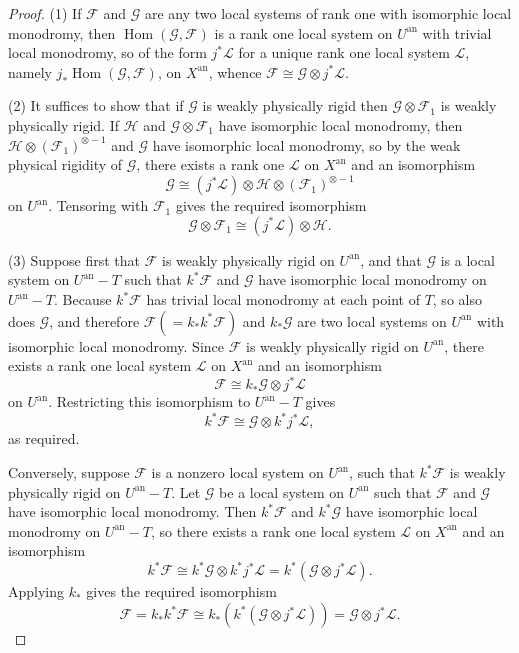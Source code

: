 \begin{proof}
(1) If \(\mathcal{F}\) and \(\mathcal{G}\) are any two local systems of rank
one with isomorphic local monodromy, then
\(\operatorname{Hom}(\mathcal{G},\mathcal{F})\) is a rank one local system on
\(U^{\mathrm{an}}\) with trivial local monodromy, so of the form \(j^*\mathcal{L}\)
for a unique rank one local system \(\mathcal{L}\), namely
\(j_*\operatorname{Hom}(\mathcal{G},\mathcal{F})\), on \(X^{\mathrm{an}}\),
whence \(\mathcal{F}\cong\mathcal{G}\otimes j^*\mathcal{L}\).

(2) It suffices to show that if \(\mathcal{G}\) is weakly physically rigid then
\(\mathcal{G}\otimes\mathcal{F}_1\) is weakly physically rigid. If
\(\mathcal{H}\) and \(\mathcal{G}\otimes\mathcal{F}_1\) have isomorphic local
monodromy, then \(\mathcal{H}\otimes(\mathcal{F}_1)^{\otimes -1}\) and
\(\mathcal{G}\) have isomorphic local monodromy, so by the weak physical
rigidity of \(\mathcal{G}\), there exists a rank one \(\mathcal{L}\) on
\(X^{\mathrm{an}}\) and an isomorphism
\[
  \mathcal{G}\cong
  (j^*\mathcal{L})\otimes\mathcal{H}\otimes(\mathcal{F}_1)^{\otimes -1}
\]
on \(U^{\mathrm{an}}\). Tensoring with \(\mathcal{F}_1\) gives the required
isomorphism
\[
  \mathcal{G}\otimes\mathcal{F}_1\cong (j^*\mathcal{L})\otimes\mathcal{H}.
\]

(3) Suppose first that \(\mathcal{F}\) is weakly physically rigid on
\(U^{\mathrm{an}}\), and that \(\mathcal{G}\) is a local system on
\(U^{\mathrm{an}}-T\) such that \(k^*\mathcal{F}\) and \(\mathcal{G}\) have
isomorphic local monodromy on \(U^{\mathrm{an}}-T\). Because \(k^*\mathcal{F}\)
has trivial local monodromy at each point of \(T\), so also does
\(\mathcal{G}\), and therefore \(\mathcal{F}(=k_*k^*\mathcal{F})\) and
\(k_*\mathcal{G}\) are two local systems on \(U^{\mathrm{an}}\) with
isomorphic local monodromy. Since \(\mathcal{F}\) is weakly physically rigid on
\(U^{\mathrm{an}}\), there exists a rank one local system \(\mathcal{L}\) on
\(X^{\mathrm{an}}\) and an isomorphism
\[
  \mathcal{F}\cong k_*\mathcal{G}\otimes j^*\mathcal{L}
\]
on \(U^{\mathrm{an}}\). Restricting this isomorphism to \(U^{\mathrm{an}}-T\)
gives
\[
  k^*\mathcal{F}\cong\mathcal{G}\otimes k^*j^*\mathcal{L},
\]
as required.

Conversely, suppose \(\mathcal{F}\) is a nonzero local system on
\(U^{\mathrm{an}}\), such that \(k^*\mathcal{F}\) is weakly physically rigid on
\(U^{\mathrm{an}}-T\). Let \(\mathcal{G}\) be a local system on
\(U^{\mathrm{an}}\) such that \(\mathcal{F}\) and \(\mathcal{G}\) have
isomorphic local monodromy. Then \(k^*\mathcal{F}\) and \(k^*\mathcal{G}\) have
isomorphic local monodromy on \(U^{\mathrm{an}}-T\), so there exists a rank one
local system \(\mathcal{L}\) on \(X^{\mathrm{an}}\) and an isomorphism
\[
  k^*\mathcal{F}\cong k^*\mathcal{G}\otimes k^*j^*\mathcal{L}
  =k^*(\mathcal{G}\otimes j^*\mathcal{L}).
\]
Applying \(k_*\) gives the required isomorphism
\[
  \mathcal{F}=k_*k^*\mathcal{F}
  \cong k_*(k^*(\mathcal{G}\otimes j^*\mathcal{L}))
  =
  \mathcal{G}\otimes j^*\mathcal{L}.
\]
\end{proof}

